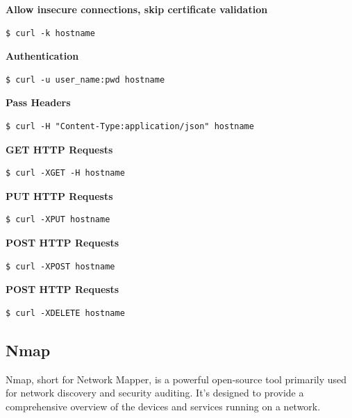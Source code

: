 \documentclass{article}
\newenvironment{codetemplate}[1][]{%
  \mybasecolorbox[#1]
  \itshape
}{%
  \endmybasecolorbox
}
\begin{document}
\textbf{Allow insecure connections, skip certificate validation}
\begin{codetemplate}{}
\begin{verbatim}
$ curl -k hostname
\end{verbatim}
\end{codetemplate}

\textbf{Authentication}
\begin{codetemplate}{}
\begin{verbatim}
$ curl -u user_name:pwd hostname 
\end{verbatim}
\end{codetemplate}

\textbf{Pass Headers}
\begin{codetemplate}{}
\begin{verbatim}
$ curl -H "Content-Type:application/json" hostname 
\end{verbatim}
\end{codetemplate}

\textbf{GET HTTP Requests}
\begin{codetemplate}{}
\begin{verbatim}
$ curl -XGET -H hostname 
\end{verbatim}
\end{codetemplate}

\textbf{PUT HTTP Requests}
\begin{codetemplate}{}
\begin{verbatim}
$ curl -XPUT hostname 
\end{verbatim}
\end{codetemplate}

\textbf{POST HTTP Requests}
\begin{codetemplate}{}
\begin{verbatim}
$ curl -XPOST hostname 
\end{verbatim}
\end{codetemplate}

\textbf{POST HTTP Requests}
\begin{codetemplate}{}
\begin{verbatim}
$ curl -XDELETE hostname 
\end{verbatim}
\end{codetemplate}

\subsection{Nmap}

Nmap, short for Network Mapper, is a powerful open-source tool primarily used for network discovery and security auditing. It's designed to provide a comprehensive overview of the devices and services running on a network.
\end{document}
